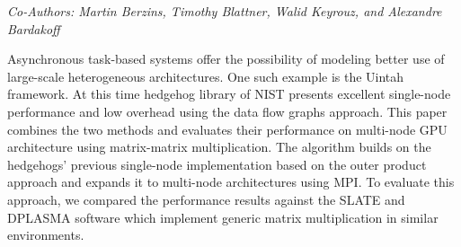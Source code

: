 \begin{center}
\textit{Co-Authors: Martin	Berzins, Timothy	Blattner, Walid	Keyrouz, and Alexandre	Bardakoff}
\end{center} 
Asynchronous task-based systems offer the possibility of modeling better use of large-scale heterogeneous architectures. One such example is the Uintah framework. At this time hedgehog library of NIST presents excellent single-node performance and low overhead using the data flow graphs approach. This paper combines the two methods and evaluates their performance on multi-node GPU architecture using matrix-matrix multiplication. The algorithm builds on the hedgehogs' previous single-node implementation based on the outer product approach and expands it to multi-node architectures using MPI. To evaluate this approach, we compared the performance results against the SLATE and DPLASMA software which implement generic matrix multiplication in similar environments.